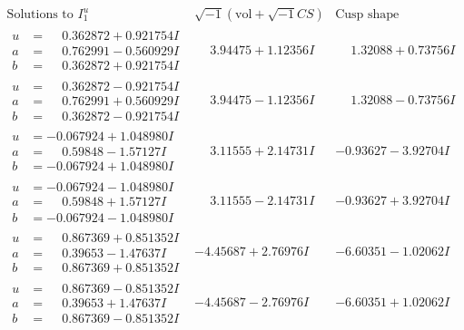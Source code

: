 \documentclass[1p]{elsarticle_modified}
\theoremstyle{definition}
\newcommand{\I}{\sqrt{-1}}
\begin{document}
$$\begin{array}{c|c|c}  
\text{Solutions to }I^u_{1}& \I (\text{vol} + \sqrt{-1}CS) & \text{Cusp shape}\\
 \hline 
\begin{aligned}
u &= \phantom{-}0.362872 + 0.921754 I \\
a &= \phantom{-}0.762991 - 0.560929 I \\
b &= \phantom{-}0.362872 + 0.921754 I\end{aligned}
 & \phantom{-}3.94475 + 1.12356 I & \phantom{-}1.32088 + 0.73756 I \\ \hline\begin{aligned}
u &= \phantom{-}0.362872 - 0.921754 I \\
a &= \phantom{-}0.762991 + 0.560929 I \\
b &= \phantom{-}0.362872 - 0.921754 I\end{aligned}
 & \phantom{-}3.94475 - 1.12356 I & \phantom{-}1.32088 - 0.73756 I \\ \hline\begin{aligned}
u &= -0.067924 + 1.048980 I \\
a &= \phantom{-}0.59848 - 1.57127 I \\
b &= -0.067924 + 1.048980 I\end{aligned}
 & \phantom{-}3.11555 + 2.14731 I & -0.93627 - 3.92704 I \\ \hline\begin{aligned}
u &= -0.067924 - 1.048980 I \\
a &= \phantom{-}0.59848 + 1.57127 I \\
b &= -0.067924 - 1.048980 I\end{aligned}
 & \phantom{-}3.11555 - 2.14731 I & -0.93627 + 3.92704 I \\ \hline\begin{aligned}
u &= \phantom{-}0.867369 + 0.851352 I \\
a &= \phantom{-}0.39653 - 1.47637 I \\
b &= \phantom{-}0.867369 + 0.851352 I\end{aligned}
 & -4.45687 + 2.76976 I & -6.60351 - 1.02062 I \\ \hline\begin{aligned}
u &= \phantom{-}0.867369 - 0.851352 I \\
a &= \phantom{-}0.39653 + 1.47637 I \\
b &= \phantom{-}0.867369 - 0.851352 I\end{aligned}
 & -4.45687 - 2.76976 I & -6.60351 + 1.02062 I \\ \hline\begin{aligned}

\end{aligned}
\end{array}$$
\end{document}
